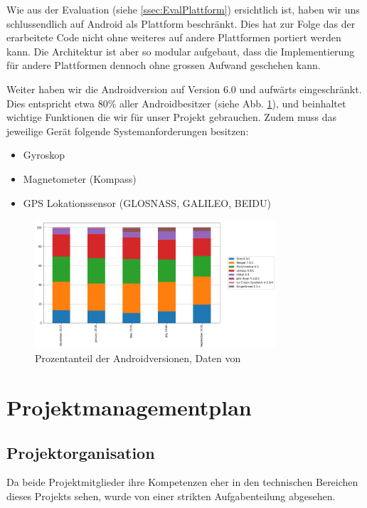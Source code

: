 \documentclass[a4paper]{scrreprt}
\begin{document}
Wie aus der Evaluation (siehe \ref{ssec:EvalPlattform}) ersichtlich ist, haben wir uns schlussendlich auf Android als Plattform beschränkt. Dies hat zur Folge das der erarbeitete Code nicht ohne weiteres auf andere Plattformen portiert werden kann. Die Architektur ist aber so modular aufgebaut, dass die Implementierung für andere Plattformen dennoch ohne grossen Aufwand geschehen kann.

Weiter haben wir die Androidversion auf Version 6.0 und aufwärts eingeschränkt. Dies entspricht etwa 80\% aller Androidbesitzer (siehe Abb. \ref{fig:AndroidMarketshare}), und beinhaltet wichtige Funktionen die wir für unser Projekt gebrauchen. Zudem muss das jeweilige Gerät folgende Systemanforderungen besitzen:
\begin{itemize}
	\item Gyroskop
	\item Magnetometer (Kompass)
	\item GPS Lokationssensor (GLOSNASS, GALILEO, BEIDU)
\end{itemize}

\begin{figure}
	\centering
	\includegraphics[keepaspectratio,width=0.8\textwidth]{AndroidMarketshare}
	\caption{Prozentanteil der Androidversionen, Daten von \cite{Fossbytes2018}}
	\label{fig:AndroidMarketshare}
\end{figure}


\newpage
\section{Projektmanagementplan}

\subsection{Projektorganisation}
Da beide Projektmitglieder ihre Kompetenzen eher in den technischen Bereichen dieses Projekts sehen, wurde von einer strikten Aufgabenteilung abgesehen.
\end{document}
